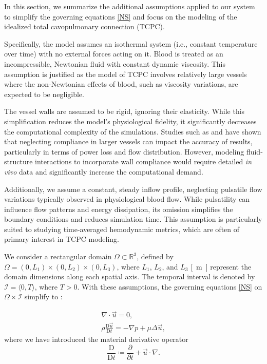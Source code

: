 
In this section, we summarize the additional assumptions applied to our system to simplify the governing equations \eqref{NS} and focus on the modeling of the idealized total cavopulmonary connection (TCPC).

Specifically, the model assumes an isothermal system (i.e., constant temperature over time) with no external forces acting on it. Blood is treated as an incompressible, Newtonian fluid with constant dynamic viscosity. This assumption is justified as the model of TCPC involves relatively large vessels where the non-Newtonian effects of blood, such as viscosity variations, are expected to be negligible.

The vessel walls are assumed to be rigid, ignoring their elasticity. While this simplification reduces the model's physiological fidelity, it significantly decreases the computational complexity of the simulations. 
Studies such as \cite{masters2004} and \cite{orlando2006} have shown that neglecting compliance in larger vessels can impact the accuracy of results, particularly in terms of power loss and flow distribution. However, modeling fluid-structure interactions to incorporate wall compliance would require detailed \textit{in vivo} data and significantly increase the computational demand.

Additionally, we assume a constant, steady inflow profile, neglecting pulsatile flow variations typically observed in physiological blood flow. While pulsatility can influence flow patterns and energy dissipation, its omission simplifies the boundary conditions and reduces simulation time. This assumption is particularly suited to studying time-averaged hemodynamic metrics, which are often of primary interest in TCPC modeling.

We consider a rectangular domain $ \Omega \subset \mathbb{R}^3 $, defined by $ \Omega = (0, L_1) \times (0, L_2) \times (0, L_3) $, where $ L_1 $, $ L_2 $, and $ L_3 $ \si{[m]} represent the domain dimensions along each spatial axis. The temporal interval is denoted by $ \mathcal{I} = \langle 0, T \rangle $, where $ T > 0 $. With these assumptions, the governing equations \eqref{NS} on $ \Omega \times \mathcal{I} $ simplify to \cite{Schlichting}:

\begin{subequations}\label{NS s predpoklady}
	\begin{gather}
		\label{a s predpoklady}
		\nabla \cdot \vec{u} = 0, \\[5pt]
		\label{b s predpoklady}
		\rho \frac{\text{D} \vec{u}}{\text{D} t} = - \nabla p + \mu \Delta \vec{u},
	\end{gather}
\end{subequations}
where we have introduced the material derivative operator
\begin{equation}
	\dfrac{\text{D}}{\text{D} t} \coloneqq \dfrac{\partial}{\partial t} + \vec{u} \cdot \nabla.
\end{equation}

